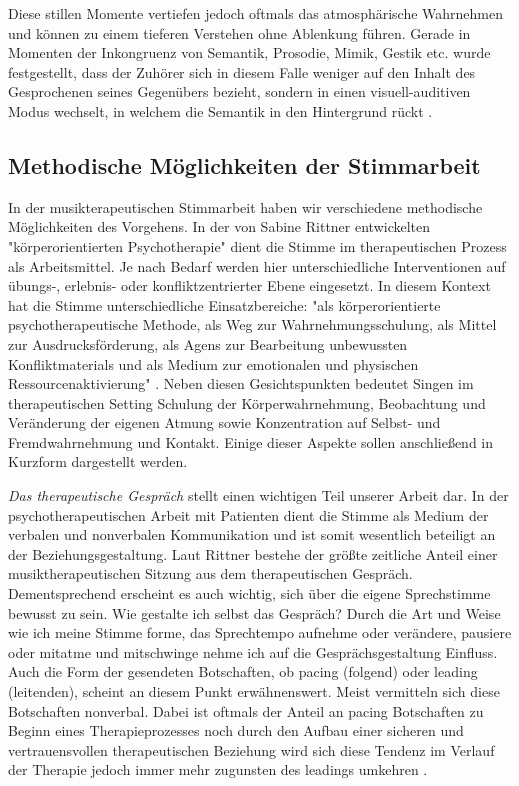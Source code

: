 Diese stillen Momente vertiefen jedoch oftmals das atmosphärische Wahrnehmen und können zu einem tieferen Verstehen ohne Ablenkung führen. 
Gerade in Momenten der Inkongruenz von Semantik, Prosodie, Mimik, Gestik etc. wurde festgestellt, dass der Zuhörer sich in diesem Falle weniger auf den Inhalt des Gesprochenen seines Gegenübers bezieht, sondern in einen visuell-auditiven Modus wechselt, in welchem die Semantik in den Hintergrund rückt \autocite [vgl.][206f.]{rittner2008}.

\subsection{Methodische Möglichkeiten der Stimmarbeit}

In der musikterapeutischen Stimmarbeit haben wir verschiedene methodische Möglichkeiten des Vorgehens. In der von Sabine Rittner entwickelten "körperorientierten Psychotherapie" dient die Stimme im therapeutischen Prozess als Arbeitsmittel. Je nach Bedarf werden hier unterschiedliche Interventionen auf übungs-, erlebnis- oder konfliktzentrierter Ebene eingesetzt. In diesem Kontext hat die Stimme unterschiedliche Einsatzbereiche: "als körperorientierte psychotherapeutische Methode, als Weg zur Wahrnehmungsschulung, als Mittel zur Ausdrucksförderung, als Agens zur Bearbeitung unbewussten Konfliktmaterials und als Medium zur emotionalen und physischen Ressourcenaktivierung" \autocite[58]{rittner2012}. Neben diesen Gesichtspunkten bedeutet Singen im therapeutischen Setting Schulung der Körperwahrnehmung, Beobachtung und Veränderung der eigenen Atmung sowie Konzentration auf Selbst- und Fremdwahrnehmung und Kontakt.
Einige dieser Aspekte sollen anschließend in Kurzform dargestellt werden.

\emph{Das therapeutische Gespräch} stellt einen wichtigen Teil unserer Arbeit dar. In der psychotherapeutischen Arbeit mit Patienten dient die Stimme als Medium der verbalen und nonverbalen Kommunikation und ist somit wesentlich beteiligt an der Beziehungsgestaltung. Laut Rittner bestehe der größte zeitliche Anteil einer musiktherapeutischen Sitzung aus dem therapeutischen Gespräch. Dementsprechend erscheint es auch wichtig, sich über die eigene Sprechstimme bewusst zu sein. Wie gestalte ich selbst das Gespräch? Durch die Art und Weise wie ich meine Stimme forme, das Sprechtempo aufnehme oder verändere, pausiere oder mitatme und mitschwinge nehme ich auf die Gesprächsgestaltung Einfluss. Auch die Form der gesendeten Botschaften, ob pacing (folgend) oder leading (leitenden), scheint an diesem Punkt erwähnenswert. Meist vermitteln sich diese Botschaften nonverbal. Dabei ist oftmals der Anteil an pacing Botschaften zu Beginn eines Therapieprozesses noch durch den Aufbau einer sicheren und vertrauensvollen therapeutischen Beziehung wird sich diese Tendenz im Verlauf der Therapie jedoch immer mehr zugunsten des leadings umkehren \autocite [vgl.][208]{rittner2008}.

